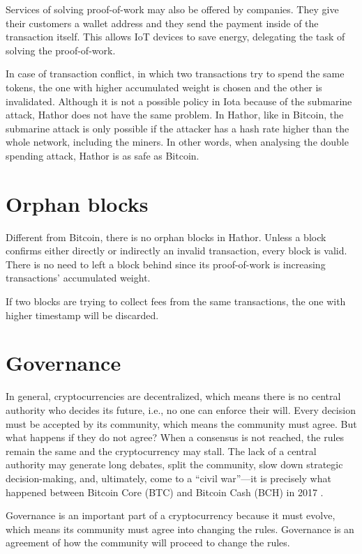 Services of solving proof-of-work may also be offered by companies. They give their customers a wallet address and they send the payment inside of the transaction itself. This allows IoT devices to save energy, delegating the task of solving the proof-of-work.

In case of transaction conflict, in which two transactions try to spend the same tokens, the one with higher accumulated weight is chosen and the other is invalidated. Although it is not a possible policy in Iota because of the submarine attack, Hathor does not have the same problem. In Hathor, like in Bitcoin, the submarine attack is only possible if the attacker has a hash rate higher than the whole network, including the miners. In other words, when analysing the double spending attack, Hathor is as safe as Bitcoin.


\section{Orphan blocks}

Different from Bitcoin, there is no orphan blocks in Hathor. Unless a block confirms either directly or indirectly an invalid transaction, every block is valid. There is no need to left a block behind since its proof-of-work is increasing transactions' accumulated weight.

If two blocks are trying to collect fees from the same transactions, the one with higher timestamp will be discarded.


\section{Governance}

In general, cryptocurrencies are decentralized, which means there is no central authority who decides its future, i.e., no one can enforce their will. Every decision must be accepted by its community, which means the community must agree. But what happens if they do not agree? When a consensus is not reached, the rules remain the same and the cryptocurrency may stall. The lack of a central authority may generate long debates, split the community, slow down strategic decision-making, and, ultimately, come to a ``civil war''---it is precisely what happened between Bitcoin Core (BTC) and Bitcoin Cash (BCH) in 2017 \citep{bloomberg2017civilwar, forbes2017civilwar}.

Governance is an important part of a cryptocurrency because it must evolve, which means its community must agree into changing the rules. Governance is an agreement of how the community will proceed to change the rules.

